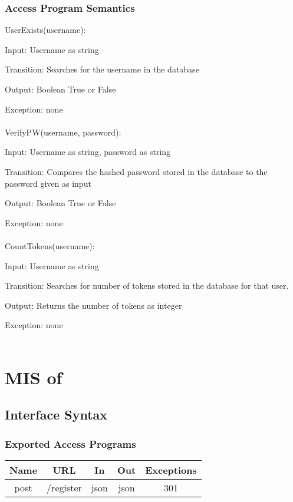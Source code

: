 \documentclass[12,english]{article}
\begin{document}
			\subsubsection{Access Program Semantics}
			UserExists(username):
			
			Input: Username as string
			
			Transition: Searches for the username in the database
			
			Output: Boolean True or False
			
			Exception: none\\
			\\
			
			VerifyPW(username, password):
			
			Input: Username as string, password as string
			
			Transition: Compares the hashed password stored in the database to the password given as input
			
			Output: Boolean True or False
			
			Exception: none\\
			\\
			
			CountTokens(username):
			
			Input: Username as string
			
			Transition: Searches for number of tokens stored in the database for that user.
			
			Output: Returns the number of tokens as integer
			
			Exception: none\\
			\\
			
			
			
			
\section{MIS of }
		\subsection{Interface Syntax}
			\subsubsection{Exported Access Programs}
				\begin{tabular}[pos]{|c|c|c|c|c|}
					
					\hline
					\textbf{Name}& \textbf{URL} & \textbf{In} & \textbf{Out} & \textbf{Exceptions} \\ \hline
					post & \slash register & json & json & 301 \\ \hline
					
				\end{tabular}
				
\end{document}
